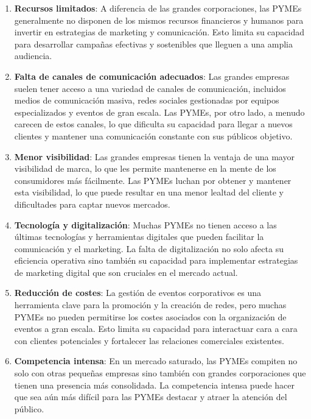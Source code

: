 \begin{enumerate}
    \item \textbf{Recursos limitados}: A diferencia de las grandes corporaciones, las PYMEs generalmente no disponen de los mismos recursos financieros 
    y humanos para invertir en estrategias de marketing y comunicación. Esto limita su capacidad para desarrollar campañas efectivas y sostenibles que
    lleguen a una amplia audiencia.
    
    \item \textbf{Falta de canales de comunicación adecuados}: Las grandes empresas suelen tener acceso a una variedad de canales de comunicación, 
    incluidos medios de comunicación masiva, redes sociales gestionadas por equipos especializados y eventos de gran escala. 
    Las PYMEs, por otro lado, a menudo carecen de estos canales, lo que dificulta su capacidad para llegar a nuevos clientes y 
    mantener una comunicación constante con sus públicos objetivo.
    
    \item \textbf{Menor visibilidad}: Las grandes empresas tienen la ventaja de una mayor visibilidad de marca, 
    lo que les permite mantenerse en la mente de los consumidores más fácilmente. Las PYMEs luchan por obtener y mantener esta visibilidad, 
    lo que puede resultar en una menor lealtad del cliente y dificultades para captar nuevos mercados.
    
    \item \textbf{Tecnología y digitalización}: Muchas PYMEs no tienen acceso a las últimas tecnologías y herramientas digitales que pueden 
    facilitar la comunicación y el marketing. La falta de digitalización no solo afecta su eficiencia operativa sino también su capacidad para 
    implementar estrategias de marketing digital que son cruciales en el mercado actual.
    
    \item \textbf{Reducción de costes}: La gestión de eventos corporativos es una herramienta clave para la promoción y la creación de redes, 
    pero muchas PYMEs no pueden permitirse los costes asociados con la organización de eventos a gran escala. Esto limita su capacidad para interactuar cara a cara con clientes potenciales y fortalecer las relaciones comerciales existentes.
    
    \item \textbf{Competencia intensa}: En un mercado saturado, las PYMEs compiten no solo con otras pequeñas empresas sino también con grandes 
    corporaciones que tienen una presencia más consolidada. La competencia intensa puede hacer que sea aún más difícil para las PYMEs destacar y 
    atraer la atención del público.
\end{enumerate}


